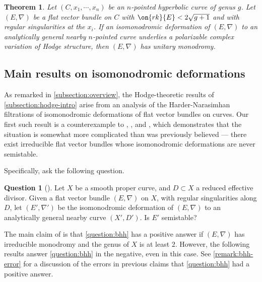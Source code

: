 \documentclass[12 pt]{amsart}
\theoremstyle{plain}
\newtheorem{theorem}[subsubsection]{Theorem}
\theoremstyle{definition}
\newtheorem{question}[subsubsection]{Question}
\theoremstyle{remark}
\numberwithin{equation}{section}
\begin{document}
\begin{theorem}\label{theorem:isomonodromic-deformation-CVHS}
Let $(C, x_1, \cdots, x_n)$ be an $n$-pointed hyperbolic curve of genus $g$.
Let $({E}, \nabla)$ be a flat vector bundle on
$C$ with $\on{rk}{E}<2\sqrt{g+1}$ and with regular singularities at the $x_i$. If an isomonodromic
deformation of ${(E, \nabla)}$ to an analytically general nearby $n$-pointed curve underlies a polarizable complex variation of Hodge structure, then $({E},\nabla)$ has unitary monodromy.
\end{theorem}

\subsection{Main results on isomonodromic deformations}
\label{subsection:isomonodromy-intro}
As remarked in \autoref{subsection:overview}, the Hodge-theoretic results of
\autoref{subsection:hodge-intro} arise from an analysis of the Harder-Narasimhan filtrations of isomonodromic deformations of flat vector bundles on curves. Our first such result is a counterexample to 
\cite[Theorem 1.3]{BHH:logarithmic},
\cite[Theorem 1.3]{BHH:irregular}, and
\cite[Theorem 1.2]{BHH:parabolic}, which demonstrates that the situation is somewhat more complicated than was previously believed --- there exist irreducible flat vector bundles whose isomonodromic deformations are never semistable. 

Specifically, \cite{BHH:logarithmic} ask the following
question. 
\begin{question}[]
	\label{question:bhh}
	Let $X$ be a smooth proper curve, and $D\subset X$ a reduced effective divisor. Given a flat vector bundle $(E, \nabla)$ on $X$, with regular singularities along $D$, let $(E', \nabla')$ be the isomonodromic deformation of $(E,\nabla)$ to an analytically general nearby curve $(X', D')$. Is $E'$ semistable?
\end{question}

The main claim of \cite{BHH:logarithmic} is that \autoref{question:bhh} has a positive answer if $(E,\nabla)$ has irreducible monodromy and the genus of $X$ is at least $2$. However, the following results answer \autoref{question:bhh} in the negative, even in this case. See \autoref{remark:bhh-error} for a discussion of the errors in previous claims that \autoref{question:bhh} had a positive answer.
\end{document}
